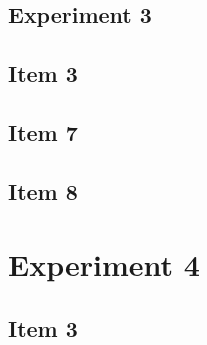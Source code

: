 \documentclass[a4paper, 11pt]{report}
\begin{document}
\begin{landscape}
\section{Experiment 3}

\setcounter{subsection}{2}
\subsection{Item 3}




\setcounter{subsection}{6}
\subsection{Item 7}

 \pagebreak

\setcounter{subsection}{7}
\subsection{Item 8}

 \pagebreak

\end{landscape}


\section{Experiment 4}

\setcounter{subsection}{2}
\subsection{Item 3}

\end{document}
